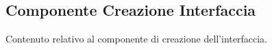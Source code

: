 \subsection{Componente Creazione Interfaccia}

Contenuto relativo al componente di creazione dell'interfaccia.
